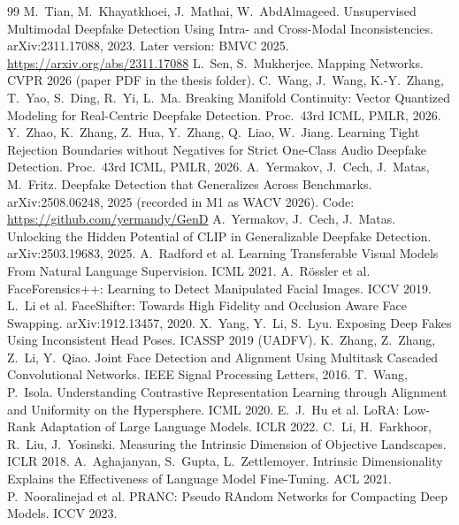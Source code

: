 \documentclass[10pt,a4paper]{article}
\begin{document}
\begin{thebibliography}{99}\small
{} M.~Tian, M.~Khayatkhoei, J.~Mathai, W.~AbdAlmageed. Unsupervised Multimodal Deepfake Detection Using Intra- and Cross-Modal Inconsistencies. arXiv:2311.17088, 2023. Later version: BMVC 2025. \url{https://arxiv.org/abs/2311.17088}
 L.~Sen, S.~Mukherjee. Mapping Networks. CVPR 2026 (paper PDF in the thesis folder).
 C.~Wang, J.~Wang, K.-Y.~Zhang, T.~Yao, S.~Ding, R.~Yi, L.~Ma. Breaking Manifold Continuity: Vector Quantized Modeling for Real-Centric Deepfake Detection. Proc.\ 43rd ICML, PMLR, 2026.
 Y.~Zhao, K.~Zhang, Z.~Hua, Y.~Zhang, Q.~Liao, W.~Jiang. Learning Tight Rejection Boundaries without Negatives for Strict One-Class Audio Deepfake Detection. Proc.\ 43rd ICML, PMLR, 2026.
 A.~Yermakov, J.~Cech, J.~Matas, M.~Fritz. Deepfake Detection that Generalizes Across Benchmarks. arXiv:2508.06248, 2025 (recorded in M1 as WACV 2026). Code: \url{https://github.com/yermandy/GenD}
 A.~Yermakov, J.~Cech, J.~Matas. Unlocking the Hidden Potential of CLIP in Generalizable Deepfake Detection. arXiv:2503.19683, 2025.
 A.~Radford et al. Learning Transferable Visual Models From Natural Language Supervision. ICML 2021.
 A.~R\"ossler et al. FaceForensics++: Learning to Detect Manipulated Facial Images. ICCV 2019.
 L.~Li et al. FaceShifter: Towards High Fidelity and Occlusion Aware Face Swapping. arXiv:1912.13457, 2020.
 X.~Yang, Y.~Li, S.~Lyu. Exposing Deep Fakes Using Inconsistent Head Poses. ICASSP 2019 (UADFV).
 K.~Zhang, Z.~Zhang, Z.~Li, Y.~Qiao. Joint Face Detection and Alignment Using Multitask Cascaded Convolutional Networks. IEEE Signal Processing Letters, 2016.
 T.~Wang, P.~Isola. Understanding Contrastive Representation Learning through Alignment and Uniformity on the Hypersphere. ICML 2020.
 E.~J.~Hu et al. LoRA: Low-Rank Adaptation of Large Language Models. ICLR 2022.
 C.~Li, H.~Farkhoor, R.~Liu, J.~Yosinski. Measuring the Intrinsic Dimension of Objective Landscapes. ICLR 2018.
 A.~Aghajanyan, S.~Gupta, L.~Zettlemoyer. Intrinsic Dimensionality Explains the Effectiveness of Language Model Fine-Tuning. ACL 2021.
 P.~Nooralinejad et al. PRANC: Pseudo RAndom Networks for Compacting Deep Models. ICCV 2023.

\end{thebibliography}
\end{document}
